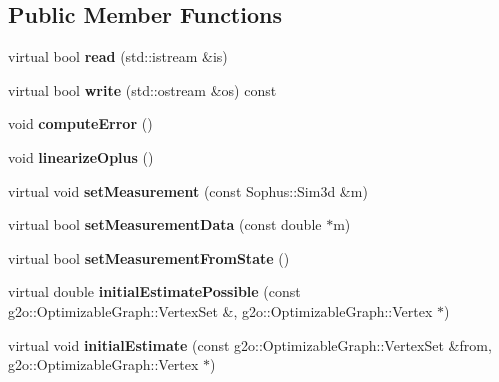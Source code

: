 \subsection*{Public Member Functions}
\begin{DoxyCompactItemize}
\item 
\hypertarget{classlsd__slam_1_1_edge_sim3_a2dd83a55e96d132bf204d2defe9672e0}{virtual bool {\bfseries read} (std\-::istream \&is)}\label{classlsd__slam_1_1_edge_sim3_a2dd83a55e96d132bf204d2defe9672e0}

\item 
\hypertarget{classlsd__slam_1_1_edge_sim3_afebade8f066f00a7cecd6637ae08d7a3}{virtual bool {\bfseries write} (std\-::ostream \&os) const }\label{classlsd__slam_1_1_edge_sim3_afebade8f066f00a7cecd6637ae08d7a3}

\item 
\hypertarget{classlsd__slam_1_1_edge_sim3_acdd278a37d942e7dc939adcf77644ad3}{void {\bfseries compute\-Error} ()}\label{classlsd__slam_1_1_edge_sim3_acdd278a37d942e7dc939adcf77644ad3}

\item 
\hypertarget{classlsd__slam_1_1_edge_sim3_a625da0349759c6412e24bcae54fdd02c}{void {\bfseries linearize\-Oplus} ()}\label{classlsd__slam_1_1_edge_sim3_a625da0349759c6412e24bcae54fdd02c}

\item 
\hypertarget{classlsd__slam_1_1_edge_sim3_a7acac082215def62ac785981774e219a}{virtual void {\bfseries set\-Measurement} (const Sophus\-::\-Sim3d \&m)}\label{classlsd__slam_1_1_edge_sim3_a7acac082215def62ac785981774e219a}

\item 
\hypertarget{classlsd__slam_1_1_edge_sim3_adf8397eef67232b720b462142580f0ef}{virtual bool {\bfseries set\-Measurement\-Data} (const double $\ast$m)}\label{classlsd__slam_1_1_edge_sim3_adf8397eef67232b720b462142580f0ef}

\item 
\hypertarget{classlsd__slam_1_1_edge_sim3_a074025100cbd539638437ce36994235c}{virtual bool {\bfseries set\-Measurement\-From\-State} ()}\label{classlsd__slam_1_1_edge_sim3_a074025100cbd539638437ce36994235c}

\item 
\hypertarget{classlsd__slam_1_1_edge_sim3_a6c606aa6b9a946bc3c1927839b345a1d}{virtual double {\bfseries initial\-Estimate\-Possible} (const g2o\-::\-Optimizable\-Graph\-::\-Vertex\-Set \&, g2o\-::\-Optimizable\-Graph\-::\-Vertex $\ast$)}\label{classlsd__slam_1_1_edge_sim3_a6c606aa6b9a946bc3c1927839b345a1d}

\item 
\hypertarget{classlsd__slam_1_1_edge_sim3_a927bd86859a9f21bdab9a9eeba53eec4}{virtual void {\bfseries initial\-Estimate} (const g2o\-::\-Optimizable\-Graph\-::\-Vertex\-Set \&from, g2o\-::\-Optimizable\-Graph\-::\-Vertex $\ast$)}\label{classlsd__slam_1_1_edge_sim3_a927bd86859a9f21bdab9a9eeba53eec4}

\end{DoxyCompactItemize}

